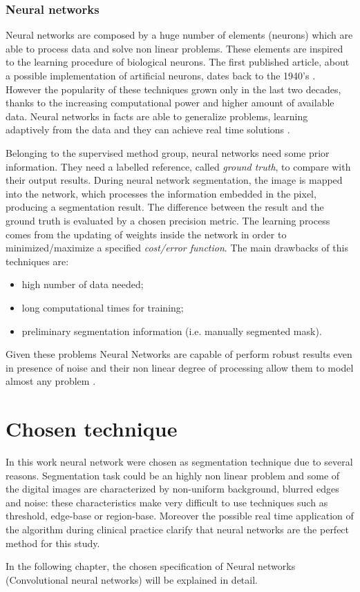 \documentclass[../main.tex]{subfiles}
\begin{document}
\subsubsection{{Neural networks}}

Neural networks are composed by a huge number of elements (neurons) which  are able to process data and solve non linear problems.
These elements are inspired to the learning procedure of biological neurons. 
The first published article, about a possible implementation of artificial neurons, dates back to the 1940's \cite{mcculloch1943logical-neural-network}.
However the popularity of these techniques grown only in the last two decades, thanks to the increasing computational power and higher amount of available data. 
Neural networks in facts are able to generalize problems, learning adaptively from the data and they can achieve real time solutions \cite{automated_segm_tech}.

Belonging to the supervised method group, neural networks need some prior information.
They need a labelled reference, called \textit{ground truth}, to compare with their output results.
During neural network segmentation, the image is mapped into the network, which processes the information embedded in the pixel, producing a segmentation result.
The difference between the result and the ground truth is evaluated by a chosen precision metric.
The learning process comes from the updating of weights inside the network in order to minimized/maximize a specified \textit{cost/error function}.
The main drawbacks of this techniques are: 
\begin{itemize}
    \item high number of data needed;
    \item long computational times for training;
    \item preliminary segmentation information (i.e. manually segmented mask).
\end{itemize}

Given these problems Neural Networks are capable of perform robust results even in presence of noise 
and their non linear degree of processing allow them to model almost any problem \cite{kang2009comparative}.



\section{Chosen technique}

In this work neural network were chosen as segmentation technique due to several reasons.
Segmentation task could be an highly non linear problem and some of the digital images are characterized by non-uniform background, blurred edges and noise: these characteristics make very difficult to use techniques such as threshold, edge-base or region-base.
Moreover the possible real time application of the algorithm during clinical practice clarify that neural networks are the perfect method for this study.

In the following chapter, the chosen specification of Neural networks (Convolutional neural networks) will be explained in detail.
\end{document}
